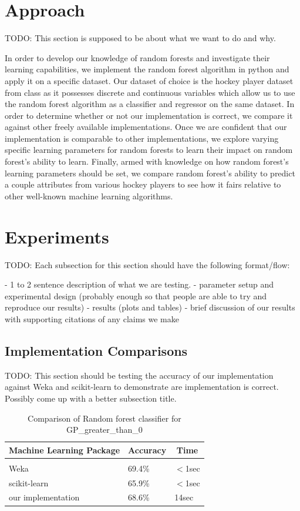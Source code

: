 \documentclass{article} %
\begin{document}
\section{Approach}

TODO: This section is supposed to be about what we want to do and why.

In order to develop our knowledge of random forests and investigate their learning capabilities, we implement the random forest algorithm in python and apply it on a specific dataset.  Our dataset of choice is the hockey player dataset from class as it possesses discrete and continuous variables which allow us to use the random forest algorithm as a classifier and regressor on the same dataset.  In order to determine whether or not our implementation is correct, we compare it against other freely available implementations.  Once we are confident that our implementation is comparable to other implementations, we explore varying specific learning parameters for random forests to learn their impact on random forest's ability to learn.  Finally, armed with knowledge on how random forest's learning parameters should be set, we compare random forest's ability to predict a couple attributes from various hockey players to see how it fairs relative to other well-known machine learning algorithms.


\section{Experiments}
TODO: Each subsection for this section should have the following format/flow:

- 1 to 2 sentence description of what we are testing.
- parameter setup and experimental design (probably enough so that people are able to try and reproduce our results)
- results (plots and tables)
- brief discussion of our results with supporting citations of any claims we make

\subsection{Implementation Comparisons}
TODO: This section should be testing the accuracy of our implementation against Weka and scikit-learn to demonstrate are implementation is correct.  Possibly come up with a better subsection title.

\begin{table}[h]
\caption{Comparison of Random forest classifier for GP\_greater\_than\_0}
\label{clas-table}
\begin{center}
\begin{tabular}{lll}
\multicolumn{1}{c}{\bf Machine Learning Package} &\multicolumn{1}{c}{\bf Accuracy} &\multicolumn{1}{c}{\bf Time}
\\ \hline \\
Weka         &69.4\%	&$<$1sec \\
scikit-learn             &65.9\%	&$<$1sec \\
our implementation             &68.6\%	&14sec \\
\end{tabular}
\end{center}
\end{table}
\end{document}
